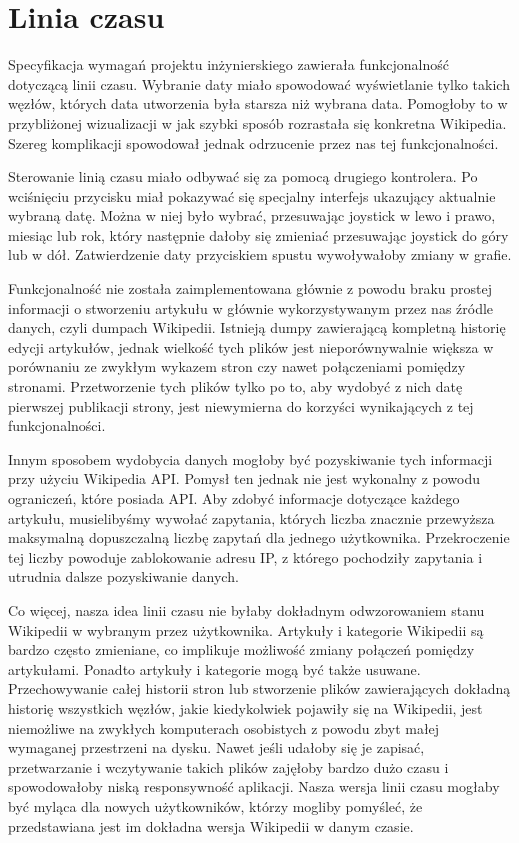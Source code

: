 \section{Linia czasu}
Specyfikacja wymagań projektu inżynierskiego zawierała funkcjonalność dotyczącą linii czasu. Wybranie daty miało spowodować wyświetlanie tylko takich węzłów, których data utworzenia była starsza niż wybrana data. Pomogłoby to w przybliżonej wizualizacji w jak szybki sposób rozrastała się konkretna Wikipedia. Szereg komplikacji spowodował jednak odrzucenie przez nas tej funkcjonalności.

Sterowanie linią czasu miało odbywać się za pomocą drugiego kontrolera. Po wciśnięciu przycisku miał pokazywać się specjalny interfejs ukazujący aktualnie wybraną datę. Można w niej było wybrać, przesuwając joystick w lewo i prawo, miesiąc lub rok, który następnie dałoby się zmieniać przesuwając joystick do góry lub w dół. Zatwierdzenie daty przyciskiem spustu wywoływałoby zmiany w grafie. 

Funkcjonalność nie została zaimplementowana głównie z powodu braku prostej informacji o stworzeniu artykułu w głównie wykorzystywanym przez nas źródle danych, czyli dumpach Wikipedii. Istnieją dumpy zawierającą kompletną historię edycji artykułów, jednak wielkość tych plików jest nieporównywalnie większa w porównaniu ze zwykłym wykazem stron czy nawet połączeniami pomiędzy stronami. Przetworzenie tych plików tylko po to, aby wydobyć z nich datę pierwszej publikacji strony, jest niewymierna do korzyści wynikających z tej funkcjonalności. 

Innym sposobem wydobycia danych mogłoby być pozyskiwanie tych informacji przy użyciu Wikipedia API. Pomysł ten jednak nie jest wykonalny z powodu ograniczeń, które posiada API. Aby zdobyć informacje dotyczące każdego artykułu, musielibyśmy wywołać zapytania, których liczba znacznie przewyższa maksymalną dopuszczalną liczbę zapytań dla jednego użytkownika. Przekroczenie tej liczby powoduje zablokowanie adresu IP, z którego pochodziły zapytania i utrudnia dalsze pozyskiwanie danych.

Co więcej, nasza idea linii czasu nie byłaby dokładnym odwzorowaniem stanu Wikipedii w wybranym przez użytkownika. Artykuły i kategorie Wikipedii są bardzo często zmieniane, co implikuje możliwość zmiany połączeń pomiędzy artykułami. Ponadto artykuły i kategorie mogą być także usuwane. Przechowywanie całej historii stron lub stworzenie plików zawierających dokładną historię wszystkich węzłów, jakie kiedykolwiek pojawiły się na Wikipedii, jest niemożliwe na zwykłych komputerach osobistych z powodu zbyt małej wymaganej przestrzeni na dysku. Nawet jeśli udałoby się je zapisać, przetwarzanie i wczytywanie takich plików zajęłoby bardzo dużo czasu i spowodowałoby niską responsywność aplikacji. Nasza wersja linii czasu mogłaby być myląca dla nowych użytkowników, którzy mogliby pomyśleć, że przedstawiana jest im dokładna wersja Wikipedii w danym czasie.

